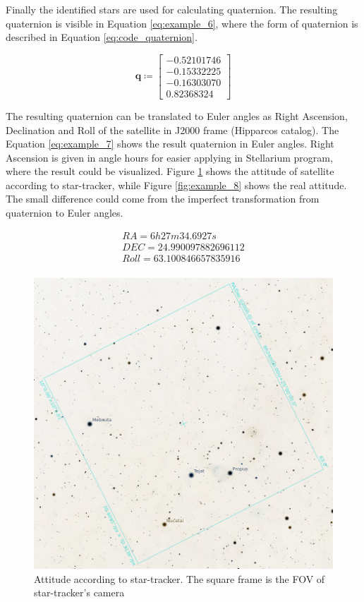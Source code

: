 \documentclass[12pt,a4paper,twoside]{article}
\begin{document}
Finally the identified stars are used for calculating quaternion. The resulting quaternion is visible in Equation \ref{eq:example_6}, where the form of quaternion is described in Equation \ref{eq:code_quaternion}.

\begin{equation} \label{eq:example_6}
\bm{q} \coloneqq \begin{bmatrix}
-0.52101746 \\
-0.15332225 \\
-0.16303070 \\
 0.82368324
\end{bmatrix}
\end{equation}

The resulting quaternion can be translated to Euler angles as Right Ascension, Declination and Roll of the satellite in J2000 frame (Hipparcos catalog). The Equation \ref{eq:example_7} shows the result quaternion in Euler angles. Right Ascension is given in angle hours for easier applying in Stellarium program, where the result could be visualized. Figure \ref{fig:example_7} shows the attitude of satellite according to star-tracker, while Figure \ref{fig:example_8} shows the real attitude. The small difference could come from the imperfect transformation from quaternion to Euler angles.

\begin{equation} \label{eq:example_7}
\begin{split}
RA = 6h27m34.6927s \\
DEC = 24.990097882696112 \\
Roll = 63.100846657835916 \\
\end{split}
\end{equation}

\begin{figure}[!htbp]
\includegraphics[scale=0.29]{example_3.png}
\centering
\caption[Attitude according to star-tracker]{Attitude according to star-tracker. The square frame is the FOV of star-tracker's camera}
\label{fig:example_7}
\end{figure}
\end{document}

